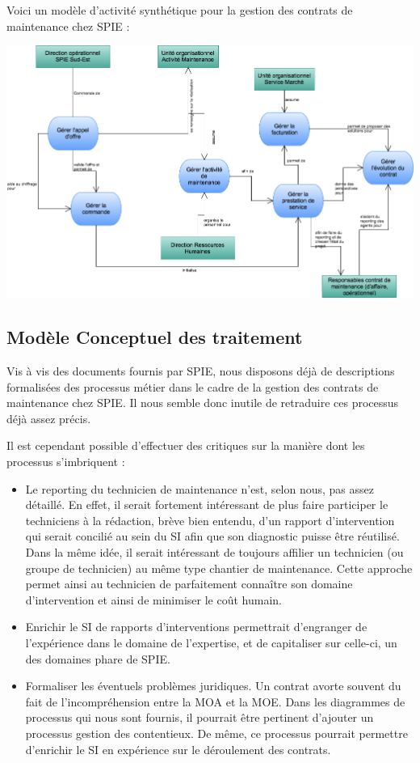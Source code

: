 Voici un modèle d'activité synthétique pour la gestion des contrats de maintenance chez SPIE :

\begin {center}
\includegraphics[width=\textwidth]{png_generaux/DiagrammeModeleActivite.png}
\end {center}

\subsection{Modèle Conceptuel des traitement} 

Vis à vis des documents fournis par SPIE, nous disposons déjà de descriptions formalisées des processus métier dans le cadre de la gestion des contrats de maintenance chez SPIE. Il nous semble donc inutile de retraduire ces processus déjà assez précis.

Il est cependant possible d'effectuer des critiques sur la manière dont les processus s'imbriquent :

\begin{itemize}
\item Le reporting du technicien de maintenance n'est, selon nous, pas assez détaillé. En effet, il serait fortement intéressant de plus faire participer le techniciens à la rédaction, brève bien entendu, d'un rapport d'intervention qui serait concilié au sein du SI afin que son diagnostic puisse être réutilisé. Dans la même idée, il serait intéressant de toujours affilier un technicien (ou groupe de technicien) au même type chantier de maintenance. Cette approche permet ainsi au technicien de parfaitement connaître son domaine d'intervention et ainsi de minimiser le coût humain.
\item Enrichir le SI de rapports d'interventions permettrait d'engranger de l'expérience dans le domaine de l'expertise, et de capitaliser sur celle-ci, un des domaines phare de SPIE.
\item Formaliser les éventuels problèmes juridiques. Un contrat avorte souvent du fait de l'incompréhension entre la MOA et la MOE. Dans les diagrammes de processus qui nous sont fournis, il pourrait être pertinent d'ajouter un processus gestion des contentieux. De même, ce processus pourrait permettre d'enrichir le SI en expérience sur le déroulement des contrats.
\end{itemize}

